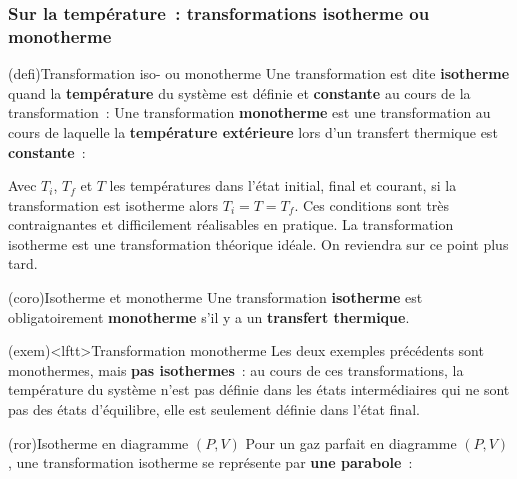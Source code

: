 \documentclass[../../main/main.tex]{subfiles}
\begin{document}
\subsubsection{Sur la température~: transformations isotherme ou monotherme}
\begin{tcb*}[sidebyside](defi){Transformation iso- ou monotherme}
	Une transformation est dite \textbf{isotherme} quand la \textbf{température} du
	système est définie et \textbf{constante} au cours de la transformation~:
	\psw{%
		\[
			\boxed{T = \cte \Lra \dd{T} = 0}
		\]
	}%
	\vspace{-15pt}
	\tcblower
	Une transformation \textbf{monotherme} est une transformation au cours de
	laquelle la \textbf{température extérieure} lors d'un transfert thermique est
	\textbf{constante}~: \psw{%
		\[
			\boxed{T\ind{ext} = \cte}
		\]
	}%
	\vspace{-15pt}
\end{tcb*}

Avec $T_i$, $T_f$ et $T$ les températures dans l'état initial, final et courant,
si la transformation est isotherme alors $T_i = T = T_f$. Ces conditions sont
très contraignantes et difficilement réalisables en pratique. La transformation
isotherme est une transformation théorique idéale. On reviendra sur ce point
plus tard.

\begin{tcb}[cnt](coro){Isotherme et monotherme}
	Une transformation \textbf{isotherme} est obligatoirement \textbf{monotherme}
	s'il y a un \textbf{transfert thermique}.
\end{tcb}

\begin{tcb}(exem)<lftt>{Transformation monotherme}
	Les deux exemples précédents sont monothermes, mais \textbf{pas isothermes}~:
	au cours de ces transformations, la température du système n'est pas définie
	dans les états intermédiaires qui ne sont pas des états d'équilibre, elle est
	seulement définie dans l'état final.
\end{tcb}

\begin{tcb*}(ror){Isotherme en diagramme $(P,V)$}
	Pour un gaz parfait en diagramme $(P,V)$, une transformation isotherme se
	représente par \textbf{une parabole}~:
	\psw{%
		\[
			PV = nRT_0 \Lra \boxed{P = \frac{nRT_0}{V}}
		\]
	}%
\end{tcb*}
\end{document}
